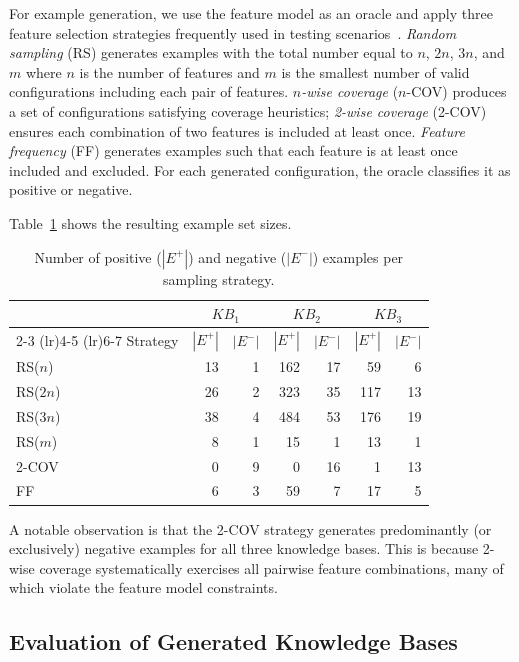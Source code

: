 For example generation, we use the feature model as an oracle and apply three feature selection
strategies frequently used in testing scenarios~\cite{pereira2021}.
\textit{Random sampling} (RS) generates examples with the total number equal to $n$, $2n$, $3n$, and $m$ where $n$ is the
number of features and $m$ is the smallest number of valid configurations
including each pair of features.
\textit{$n$-wise coverage} ($n$-COV) produces a set of configurations satisfying coverage heuristics; \textit{2-wise coverage} (2-COV) ensures
each combination of two features is included at least once.
\textit{Feature frequency} (FF) generates examples such that each
feature is at least once included and excluded. For each generated configuration, the oracle
classifies it as positive or negative.

Table~\ref{tab:example_sizes} shows the resulting example set sizes.

\begin{table}[htbp]
\centering
\caption{Number of positive ($|E^+|$) and negative ($|E^-|$) examples per sampling strategy.}
\label{tab:example_sizes}
\begin{tabular}{lrrrrrr}
\toprule
 & \multicolumn{2}{c}{$KB_1$} & \multicolumn{2}{c}{$KB_2$} & \multicolumn{2}{c}{$KB_3$} \\
\cmidrule(lr){2-3} \cmidrule(lr){4-5} \cmidrule(lr){6-7}
Strategy & $|E^+|$ & $|E^-|$ & $|E^+|$ & $|E^-|$ & $|E^+|$ & $|E^-|$ \\
\midrule
RS($n$)  &  13 &  1 & 162 & 17 &  59 &  6 \\
RS($2n$) &  26 &  2 & 323 & 35 & 117 & 13 \\
RS($3n$) &  38 &  4 & 484 & 53 & 176 & 19 \\
RS($m$)  &   8 &  1 &  15 &  1 &  13 &  1 \\
2-COV    &   0 &  9 &   0 & 16 &   1 & 13 \\
FF       &   6 &  3 &  59 &  7 &  17 &  5 \\
\bottomrule
\end{tabular}
\end{table}

A notable observation is that the 2-COV strategy generates predominantly (or exclusively) negative examples for all three knowledge bases. This is because 2-wise coverage systematically exercises all pairwise feature combinations, many of which violate the feature model constraints.

\subsection{Evaluation of Generated Knowledge Bases}

